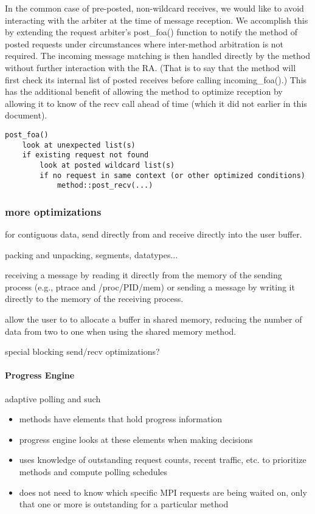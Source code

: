 In the common case of pre-posted, non-wildcard receives, we would like to avoid
interacting with the arbiter at the time of message reception.  We accomplish
this by extending the request arbiter's post_foa() function to notify the
method of posted requests under circumstances where inter-method arbitration is
not required.  The incoming message matching is then handled directly by the
method without further interaction with the RA.  (That is to say that the
method will first check its internal list of posted receives before calling
incoming_foa().)  This has the additional benefit of allowing the method to
optimize reception by allowing it to know of the recv call ahead of time (which
it did not earlier in this document).

\begin{verbatim}
post_foa()
    look at unexpected list(s)
    if existing request not found
        look at posted wildcard list(s)
        if no request in same context (or other optimized conditions)
            method::post_recv(...)
\end{verbatim}


\subsubsection{more optimizations}

for contiguous data, send directly from and receive directly into the
user buffer.

packing and unpacking, segments, datatypes...

receiving a message by reading it directly from the memory of the
sending process (e.g., ptrace and /proc/PID/mem) or sending a message
by writing it directly to the memory of the receiving process.

allow the user to  to allocate a buffer in shared
memory, reducing the number of data from two to one when using the
shared memory method.

special blocking send/recv optimizations?

\paragraph{Progress Engine} adaptive polling and such
\begin{itemize}
\item methods have elements that hold progress information
\item progress engine looks at these elements when making decisions
\item uses knowledge of outstanding request counts, recent traffic, etc. to
  prioritize methods and compute polling schedules
\item does not need to know which specific MPI requests are being waited
  on, only that one or more is outstanding for a particular method
\end{itemize}
  
